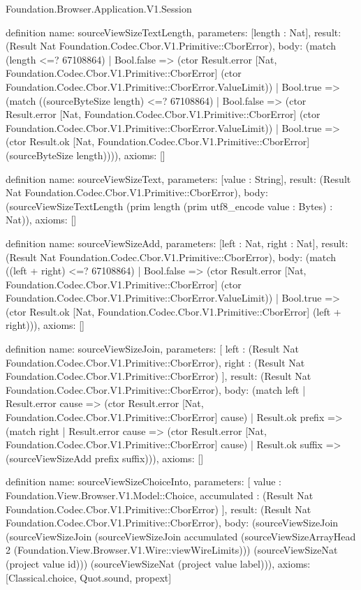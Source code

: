 \begin{lexlean}{Foundation.Browser.Application.V1.Session}
\begin{semanticmodule}
definition{
  name: sourceViewSizeTextLength,
  parameters: [length : Nat],
  result: (Result Nat Foundation.Codec.Cbor.V1.Primitive::CborError),
  body: (match (length <=? 67108864)
    | Bool.false => (ctor Result.error [Nat, Foundation.Codec.Cbor.V1.Primitive::CborError] (ctor Foundation.Codec.Cbor.V1.Primitive::CborError.ValueLimit))
    | Bool.true => (match ((sourceByteSize length) <=? 67108864)
      | Bool.false => (ctor Result.error [Nat, Foundation.Codec.Cbor.V1.Primitive::CborError] (ctor Foundation.Codec.Cbor.V1.Primitive::CborError.ValueLimit))
      | Bool.true => (ctor Result.ok [Nat, Foundation.Codec.Cbor.V1.Primitive::CborError] (sourceByteSize length)))),
  axioms: []
}

definition{
  name: sourceViewSizeText,
  parameters: [value : String],
  result: (Result Nat Foundation.Codec.Cbor.V1.Primitive::CborError),
  body: (sourceViewSizeTextLength (prim length (prim utf8_encode value : Bytes) : Nat)),
  axioms: []
}

definition{
  name: sourceViewSizeAdd,
  parameters: [left : Nat, right : Nat],
  result: (Result Nat Foundation.Codec.Cbor.V1.Primitive::CborError),
  body: (match ((left + right) <=? 67108864)
    | Bool.false => (ctor Result.error [Nat, Foundation.Codec.Cbor.V1.Primitive::CborError] (ctor Foundation.Codec.Cbor.V1.Primitive::CborError.ValueLimit))
    | Bool.true => (ctor Result.ok [Nat, Foundation.Codec.Cbor.V1.Primitive::CborError] (left + right))),
  axioms: []
}

definition{
  name: sourceViewSizeJoin,
  parameters: [
    left : (Result Nat Foundation.Codec.Cbor.V1.Primitive::CborError),
    right : (Result Nat Foundation.Codec.Cbor.V1.Primitive::CborError)
  ],
  result: (Result Nat Foundation.Codec.Cbor.V1.Primitive::CborError),
  body: (match left
    | Result.error cause => (ctor Result.error [Nat, Foundation.Codec.Cbor.V1.Primitive::CborError] cause)
    | Result.ok prefix => (match right
      | Result.error cause => (ctor Result.error [Nat, Foundation.Codec.Cbor.V1.Primitive::CborError] cause)
      | Result.ok suffix => (sourceViewSizeAdd prefix suffix))),
  axioms: []
}

definition{
  name: sourceViewSizeChoiceInto,
  parameters: [
    value : Foundation.View.Browser.V1.Model::Choice,
    accumulated : (Result Nat Foundation.Codec.Cbor.V1.Primitive::CborError)
  ],
  result: (Result Nat Foundation.Codec.Cbor.V1.Primitive::CborError),
  body: (sourceViewSizeJoin (sourceViewSizeJoin (sourceViewSizeJoin accumulated (sourceViewSizeArrayHead 2 (Foundation.View.Browser.V1.Wire::viewWireLimits))) (sourceViewSizeNat (project value id))) (sourceViewSizeNat (project value label))),
  axioms: [Classical.choice, Quot.sound, propext]
}


\end{semanticmodule}
\end{lexlean}
